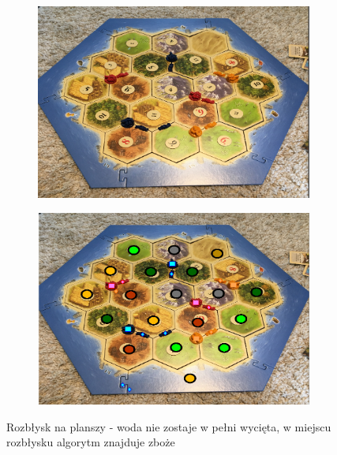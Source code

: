 \documentclass[a4paper]{article}
\begin{document}
	 \begin{figure}[H]
        \begin{subfigure}[]{0.5\linewidth}
        \includegraphics[width=\linewidth]{pictures/fields/flash.png}
        \end{subfigure}
        \begin{subfigure}[]{0.5\linewidth}
        \includegraphics[width=\linewidth]{pictures/fields/after_flash.png}
        \end{subfigure}

        \caption{Rozbłysk na planszy - woda nie zostaje w pełni wycięta, w miejscu rozbłysku
        algorytm znajduje zboże}
        \label{fig:step6}
    \end{figure}
    
\end{document}
